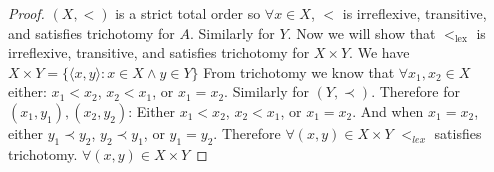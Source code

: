 \documentclass[11pt]{amsart}
\begin{document}
\begin{enumerate}
\begin{proof}
 $(X,<)$ is a strict total order so $\forall x \in X$, $<$ is irreflexive, transitive, and satisfies trichotomy for $A$.
 Similarly for $Y$.
 Now we will show that $<_{\text{lex}}$ is irreflexive, transitive, and satisfies trichotomy for $X \times Y$.
 We have $X \times Y = \{\langle x, y \rangle : x \in X \wedge y \in Y\}$
 From trichotomy we know that $\forall x_1,x_2 \in X$ either: $x_1 < x_2$, $x_2 < x_1$, or $x_1 = x_2$.
 Similarly for $(Y,\prec)$.
 Therefore for $(x_1,y_1), (x_2,y_2)$:
 Either $x_1 < x_2$, $x_2 < x_1$, or $x_1 = x_2$.
 And when $x_1 = x_2$, either $y_1 \prec y_2$, $y_2 \prec y_1$, or $y_1 = y_2$.
 Therefore $\forall (x,y) \in X \times Y$ $<_{lex}$ satisfies trichotomy.
 $\forall (x,y) \in X \times Y$
 \end{proof}
%

\end{enumerate}
\end{document}
